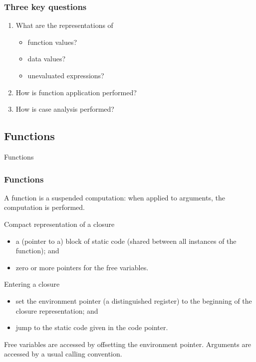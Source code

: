 \documentclass{beamer}
\begin{document}
\begin{frame}
    \frametitle{Three key questions}

    \begin{enumerate}
        \item What are the representations of
            \begin{itemize}
                \item function values?
                \item data values?
                \item unevaluated expressions?
            \end{itemize}

        \item How is function application performed?

        \item How is case analysis performed?
    \end{enumerate}
\end{frame}

\subsection{Functions}

\begin{frame}
    \huge{Functions}
\end{frame}

\begin{frame}
    \frametitle{Functions}

    A function is a suspended computation: when applied to arguments, the
    computation is performed.

    \begin{block}{Compact representation of a closure}
        \begin{itemize}
            \item
                a (pointer to a) block of \alert{static code} (shared between
                all instances of the function); and
            \item
                zero or more pointers for the \alert{free variables}.
        \end{itemize}
    \end{block}


    \begin{block}{Entering a closure}
        \begin{itemize}
            \item
                set the \alert{environment pointer} (a distinguished register)
                to the beginning of the closure representation; and
            \item
                jump to the static code given in the code pointer.
        \end{itemize}
        Free variables are accessed by offsetting the environment pointer.
        Arguments are accessed by a usual calling convention.
    \end{block}
\end{frame}
\end{document}
